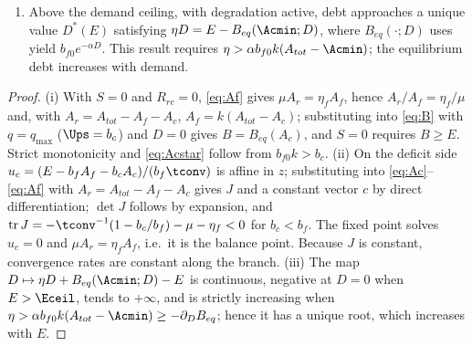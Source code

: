 \begin{proposition}
\begin{enumerate}[label=(\roman*)]
\begin{equation}
\qquad \det J=\frac{\mu+\eta_f}{\tconv}\Big(k-\frac{b_c}{b_f}\Big),
\end{equation}
and $\operatorname{tr}J<0$. The matrix does not depend on demand or on the current state. Its determinant is positive exactly when $B_{eq}$ decreases, and its fixed point is the balance point in (i). For $B_{eq}(A_{tot})\le E<\Eceil$, trajectories that remain in this regime approach that point at rates set by the eigenvalues of $J$. For $E>\Eceil$, the balance point would lie below the allowed minimum: $A_c$ approaches $\Acmin$ asymptotically and the shortfall tends to $S^*=E-\Eceil>0$. Thus the reduced balance curve meets the minimum-area boundary; it does not turn back or form a fold. The leading eigenvalue does not approach zero at $E=\Eceil$, and the reduced equilibrium relation has no hysteresis. These conclusions hold under the stated assumptions and do not imply that the realized land allocation is independent of its history.
\item Above the demand ceiling, with degradation active, debt approaches a unique value $D^*(E)$ satisfying $\eta D=E-B_{eq}(\Acmin;D)$, where $B_{eq}(\cdot;D)$ uses yield $b_{f0}e^{-\alpha D}$. This result requires $\eta>\alpha b_{f0}k(A_{tot}-\Acmin)$; the equilibrium debt increases with demand.
\end{enumerate}
\end{proposition}

\begin{proof}
(i) With $S=0$ and $R_{rc}=0$, \eqref{eq:Af} gives $\mu A_r=\eta_fA_f$, hence $A_r/A_f=\eta_f/\mu$ and, with $A_r=A_{tot}-A_f-A_c$, $A_f=k(A_{tot}-A_c)$; substituting into \eqref{eq:B} with $q=q_{\max}$ ($\Ups=b_c$) and $D=0$ gives $B=B_{eq}(A_c)$, and $S=0$ requires $B\ge E$. Strict monotonicity and \eqref{eq:Acstar} follow from $b_{f0}k>b_c$. (ii) On the deficit side $u_c=(E-b_fA_f-b_cA_c)/(b_f\tconv)$ is affine in $z$; substituting into \eqref{eq:Ac}--\eqref{eq:Af} with $A_r=A_{tot}-A_f-A_c$ gives $J$ and a constant vector $c$ by direct differentiation; $\det J$ follows by expansion, and $\operatorname{tr}J=-\tconv^{-1}(1-b_c/b_f)-\mu-\eta_f<0$ for $b_c<b_f$. The fixed point solves $u_c=0$ and $\mu A_r=\eta_fA_f$, i.e.\ it is the balance point. Because $J$ is constant, convergence rates are constant along the branch. (iii) The map $D\mapsto\eta D+B_{eq}(\Acmin;D)-E$ is continuous, negative at $D=0$ when $E>\Eceil$, tends to $+\infty$, and is strictly increasing when $\eta>\alpha b_{f0}k(A_{tot}-\Acmin)\ge-\partial_DB_{eq}$; hence it has a unique root, which increases with $E$.
\end{proof}

